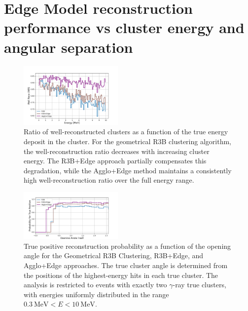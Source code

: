 \documentclass[review,sort&compress]{elsarticle}
\begin{document}
\section{Edge Model reconstruction performance vs cluster energy and angular separation}

\begin{figure}[!h]
        \centering
        \includegraphics[width=0.45\textwidth]{well_reco_vs_energy.png}

		\caption{
		Ratio of well-reconstructed clusters as a function of the true energy deposit in the cluster. For the geometrical R3B clustering algorithm, the well-reconstruction ratio decreases with increasing cluster energy. The R3B+Edge approach partially compensates this degradation, while the Agglo+Edge method maintains a consistently high well-reconstruction ratio over the full energy range.	
		}

        \label{fig:wr_vs_ene}%
\end{figure}

\begin{figure}[!h]
        \centering
        \includegraphics[width=0.45\textwidth]{well_reco_vs_opang.png}

		\caption{
		True positive reconstruction probability as a function of the opening angle for the Geometrical R3B Clustering, R3B+Edge, and Agglo+Edge approaches. The true cluster angle is determined from the positions of the highest-energy hits in each true cluster. The analysis is restricted to events with exactly two $\gamma$-ray true clusters, with energies uniformly distributed in the range $0.3~\text{MeV} < E < 10~\text{MeV}$.
		}

        \label{fig:wr_vs_opang}%
\end{figure}

\clearpage
\end{document}
